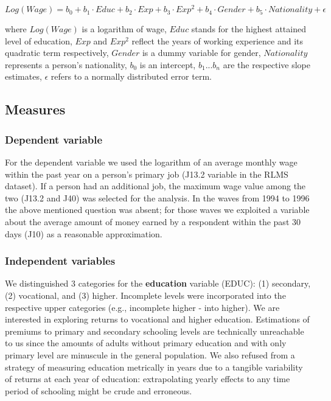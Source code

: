 \documentclass[12pt,a4paper]{article}
\begin{document}
$$Log(Wage) = b_0 + b_1\cdot Educ + b_2\cdot Exp + b_3\cdot Exp^2 + b_4\cdot Gender + b_5\cdot Nationality + \epsilon$$

where $Log(Wage)$ is a logarithm of wage, $Educ$ stands for the highest attained level of education, $Exp$ and $Exp^2$ reflect the years of working experience and its quadratic term respectively, $Gender$ is a dummy variable for gender, $Nationality$ represents a person's nationality, $b_0$ is an intercept, $b_1 ... b_n$ are the respective slope estimates, $\epsilon$ refers to a normally distributed error term.
\\

\subsection*{Measures}

\subsubsection*{Dependent variable}

For the dependent variable we used the logarithm of an average monthly wage within the past year on a person's primary job (J13.2 variable in the RLMS dataset). If a person had an additional job, the maximum wage value among the two (J13.2 and J40) was selected for the analysis. In the waves from 1994 to 1996 the above mentioned question was absent; for those waves we exploited a variable about the average amount of money earned by a respondent within the past 30 days (J10) as a reasonable approximation.
\\

\subsubsection*{Independent variables}

We distinguished 3 categories for the {\bf education} variable (EDUC): (1) secondary, (2) vocational, and (3) higher. Incomplete levels were incorporated into the respective upper categories (e.g., incomplete higher - into higher). We are interested in exploring returns to vocational and higher education. Estimations of premiums to primary and secondary schooling levels are technically unreachable to us since the amounts of adults without primary education and with only primary level are minuscule in the general population. We also refused from a strategy of measuring education metrically in years due to a tangible variability of returns at each year of education: extrapolating yearly effects to any time period of schooling might be crude and erroneous.
\\
\end{document}
